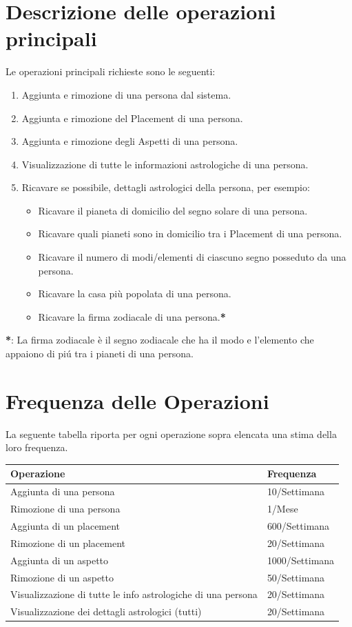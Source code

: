 \section{Descrizione delle operazioni principali}
\label{sec:opprinc}
Le operazioni principali richieste sono le seguenti:
\begin{enumerate}
	\item Aggiunta e rimozione di una persona dal sistema.
	\item Aggiunta e rimozione del Placement di una persona.
	\item Aggiunta e rimozione degli Aspetti di una persona.
	\item Visualizzazione di tutte le informazioni astrologiche di una persona.
	\item Ricavare se possibile, dettagli astrologici della persona, per esempio:
	\begin{itemize}
		\item Ricavare il pianeta di domicilio del segno solare di una persona.
		\item Ricavare quali pianeti sono in domicilio tra i Placement di una persona.
	  \item Ricavare il numero di modi/elementi di ciascuno segno posseduto da una persona.
		\item Ricavare la casa più popolata di una persona.
		\item Ricavare la firma zodiacale di una persona.\textbf{*}
	\end{itemize}
\end{enumerate}
\textbf{*}: La firma zodiacale è il segno zodiacale che ha il modo e l'elemento che appaiono di piú tra i pianeti di una persona.
\section{Frequenza delle Operazioni}
La seguente tabella riporta per ogni operazione sopra elencata una stima della loro frequenza.
{
\begin{longtable}{ |p{10cm}|p{3cm}|  }
\endfoot
\hline
\textbf{Operazione} & \textbf{Frequenza} \\
\hline
Aggiunta di una persona & 10/Settimana\\
Rimozione di una persona & 1/Mese \\
Aggiunta di un placement & 600/Settimana \\
Rimozione di un placement & 20/Settimana \\
Aggiunta di un aspetto & 1000/Settimana \\
Rimozione di un aspetto & 50/Settimana \\
Visualizzazione di tutte le info astrologiche di una persona & 20/Settimana \\
Visualizzazione dei dettagli astrologici (tutti) & 20/Settimana \\
\hline
\end{longtable}
}

